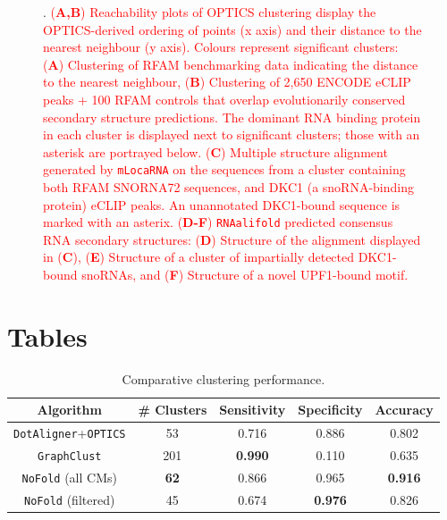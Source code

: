 \documentclass{bmcart}
\newcommand\dotaligner{\texttt{DotAligner}}
\newcommand\nofold{\texttt{NoFold}}
\begin{document}
\begin{backmatter}
\begin{figure}[h!]
 \caption {. 
 \textcolor{red} {
 (\textbf{A,B}) Reachability plots of OPTICS clustering display the OPTICS-derived ordering of points (x axis) and their distance to the nearest neighbour (y axis). Colours represent significant clusters: (\textbf{A}) Clustering of RFAM benchmarking data indicating the distance to the nearest neighbour,
 (\textbf{B}) Clustering of 2,650 ENCODE eCLIP peaks + 100 RFAM controls that overlap evolutionarily conserved secondary structure predictions. The dominant RNA binding protein in each cluster is displayed next to significant clusters; those with an asterisk are portrayed below.
 (\textbf{C}) Multiple structure alignment generated by \texttt{mLocaRNA} on the sequences from a 
 cluster containing both RFAM SNORNA72 sequences, and DKC1 (a snoRNA-binding protein) eCLIP peaks. 
An unannotated DKC1-bound sequence is marked with an asterix.
 (\textbf{D-F}) \texttt{RNAalifold} predicted consensus RNA secondary structures: 
 (\textbf{D}) Structure of the alignment displayed in (\textbf{C}), 
 (\textbf{E}) Structure of a cluster of impartially detected DKC1-bound snoRNAs, and
 (\textbf{F}) Structure of a novel UPF1-bound motif. }}
\end{figure}



\section*{Tables}

\begin{table}[h!]
\caption{ Comparative clustering performance. }
 \begin{tabular}{ccccc}
 \hline
 Algorithm & \# Clusters & Sensitivity & Specificity & Accuracy \\
 \hline
 \dotaligner{}+\texttt{OPTICS} & 53 & 0.716 & 0.886& 0.802\\
 \texttt{GraphClust} & 201 & \textbf{0.990} & 0.110 & 0.635\\ %
 \nofold{} (all CMs) & \textbf{62} & 0.866 & 0.965 & \textbf{0.916 }\\ %
 \nofold{} (filtered) & 45 & 0.674 & \textbf{0.976} & 0.826\\ %
 \hline
 \end{tabular}
\end{table}





\end{backmatter}
\end{document}
